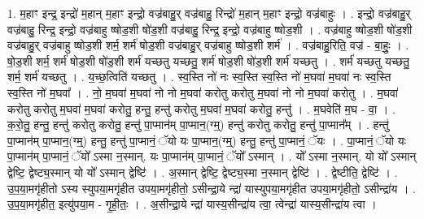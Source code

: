 \documentclass[17pt]{extarticle}
\begin{document}
1. म॒हाꣳ इन्द्र॒ इन्द्रो॑ म॒हान् म॒हाꣳ इन्द्रो॒ वज्र॑बाहु॒र् वज्र॑बाहु॒ रिन्द्रो॑ म॒हान् म॒हाꣳ इन्द्रो॒ वज्र॑बाहुः । . इन्द्रो॒ वज्र॑बाहु॒र् वज्र॑बाहु॒ रिन्द्र॒ इन्द्रो॒ वज्र॑बाहु ष्षोड॒शी षो॑ड॒शी वज्र॑बाहु॒ रिन्द्र॒ इन्द्रो॒ वज्र॑बाहु ष्षोड॒शी । . वज्र॑बाहु ष्षोड॒शी षो॑ड॒शी वज्र॑बाहु॒र् वज्र॑बाहु ष्षोड॒शी शर्म॒ शर्म॑ षोड॒शी वज्र॑बाहु॒र् वज्र॑बाहु ष्षोड॒शी शर्म॑ । . वज्र॑बाहु॒रिति॒ वज्र॑ - बा॒हुः॒ । . षो॒ड॒शी शर्म॒ शर्म॑ षोड॒शी षो॑ड॒शी शर्म॑ यच्छतु यच्छतु॒ शर्म॑ षोड॒शी षो॑ड॒शी शर्म॑ यच्छतु । . शर्म॑ यच्छतु यच्छतु॒ शर्म॒ शर्म॑ यच्छतु । . य॒च्छ॒त्विति॑ यच्छतु । . स्व॒स्ति नो॑ नः स्व॒स्ति स्व॒स्ति नो॑ म॒घवा॑ म॒घवा॑ नः स्व॒स्ति स्व॒स्ति नो॑ म॒घवा᳚ । . नो॒ म॒घवा॑ म॒घवा॑ नो नो म॒घवा॑ करोतु करोतु म॒घवा॑ नो नो म॒घवा॑ करोतु । . म॒घवा॑ करोतु करोतु म॒घवा॑ म॒घवा॑ करोतु॒ हन्तु॒ हन्तु॑ करोतु म॒घवा॑ म॒घवा॑ करोतु॒ हन्तु॑ । . म॒घवेति॑ म॒घ - वा॒ । . क॒रो॒तु॒ हन्तु॒ हन्तु॑ करोतु करोतु॒ हन्तु॑ पा॒प्मान॑म् पा॒प्मान॒(ग्म्॒) हन्तु॑ करोतु करोतु॒ हन्तु॑ पा॒प्मान᳚म् । . हन्तु॑ पा॒प्मान॑म् पा॒प्मान॒(ग्म्॒) हन्तु॒ हन्तु॑ पा॒प्मानं॒ ॅयो यः पा॒प्मान॒(ग्म्॒) हन्तु॒ हन्तु॑ पा॒प्मानं॒ ॅयः । . पा॒प्मानं॒ ॅयो यः पा॒प्मान॑म् पा॒प्मानं॒ ॅयो᳚ ऽस्मा न॒स्मान्. यः पा॒प्मान॑म् पा॒प्मानं॒ ॅयो᳚ ऽस्मान् । . यो᳚ ऽस्मा न॒स्मान्. यो यो᳚ ऽस्मान् द्वेष्टि॒ द्वेष्ट्य॒स्मान् यो यो᳚ ऽस्मान् द्वेष्टि॑ । . अ॒स्मान् द्वेष्टि॒ द्वेष्ट्य॒स्मा न॒स्मान् द्वेष्टि॑ । . द्वेष्टीति॒ द्वेष्टि॑ । . उ॒प॒या॒मगृ॑हीतो ऽस्य स्युपया॒मगृ॑हीत उपया॒मगृ॑हीतो॒ ऽसीन्द्रा॒ये न्द्रा॑ यास्युपया॒मगृ॑हीत उपया॒मगृ॑हीतो॒ ऽसीन्द्रा॑य । . उ॒प॒या॒मगृ॑हीत॒ इत्यु॑पया॒म - गृ॒ही॒तः॒ । . अ॒सीन्द्रा॒ये न्द्रा॑ यास्य॒सीन्द्रा॑य त्वा॒ त्वेन्द्रा॑ यास्य॒सीन्द्रा॑य त्वा । \newline
\end{document}
